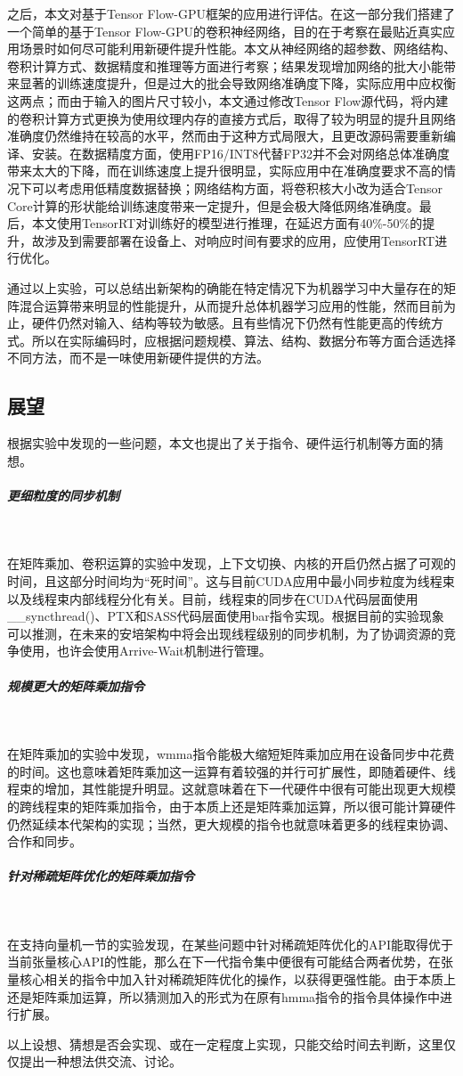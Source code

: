\par 之后，本文对基于Tensor Flow-GPU框架的应用进行评估。在这一部分我们搭建了一个简单的基于Tensor Flow-GPU的卷积神经网络，目的在于考察在最贴近真实应用场景时如何尽可能利用新硬件提升性能。本文从神经网络的超参数、网络结构、卷积计算方式、数据精度和推理等方面进行考察；结果发现增加网络的批大小能带来显著的训练速度提升，但是过大的批会导致网络准确度下降，实际应用中应权衡这两点；而由于输入的图片尺寸较小，本文通过修改Tensor Flow源代码，将内建的卷积计算方式更换为使用纹理内存的直接方式后，取得了较为明显的提升且网络准确度仍然维持在较高的水平，然而由于这种方式局限大，且更改源码需要重新编译、安装。在数据精度方面，使用FP16/INT8代替FP32并不会对网络总体准确度带来太大的下降，而在训练速度上提升很明显，实际应用中在准确度要求不高的情况下可以考虑用低精度数据替换；网络结构方面，将卷积核大小改为适合Tensor Core计算的形状能给训练速度带来一定提升，但是会极大降低网络准确度。最后，本文使用TensorRT对训练好的模型进行推理，在延迟方面有40\%-50\%的提升，故涉及到需要部署在设备上、对响应时间有要求的应用，应使用TensorRT进行优化。
\par 通过以上实验，可以总结出新架构的确能在特定情况下为机器学习中大量存在的矩阵混合运算带来明显的性能提升，从而提升总体机器学习应用的性能，然而目前为止，硬件仍然对输入、结构等较为敏感。且有些情况下仍然有性能更高的传统方式。所以在实际编码时，应根据问题规模、算法、结构、数据分布等方面合适选择不同方法，而不是一味使用新硬件提供的方法。
\subsection{展望}
\par 根据实验中发现的一些问题，本文也提出了关于指令、硬件运行机制等方面的猜想。
\subparagraph{更细粒度的同步机制}~{}
\par 在矩阵乘加、卷积运算的实验中发现，上下文切换、内核的开启仍然占据了可观的时间，且这部分时间均为“死时间”。这与目前CUDA应用中最小同步粒度为线程束以及线程束内部线程分化有关。目前，线程束的同步在CUDA代码层面使用\_\_syncthread()、PTX和SASS代码层面使用bar指令实现。根据目前的实验现象可以推测，在未来的安培架构中将会出现线程级别的同步机制，为了协调资源的竞争使用，也许会使用Arrive-Wait机制进行管理。
\subparagraph{规模更大的矩阵乘加指令}~{}
\par 在矩阵乘加的实验中发现，wmma指令能极大缩短矩阵乘加应用在设备同步中花费的时间。这也意味着矩阵乘加这一运算有着较强的并行可扩展性，即随着硬件、线程束的增加，其性能提升明显\cite{SCALABLITY}。这就意味着在下一代硬件中很有可能出现更大规模的跨线程束的矩阵乘加指令，由于本质上还是矩阵乘加运算，所以很可能计算硬件仍然延续本代架构的实现；当然，更大规模的指令也就意味着更多的线程束协调、合作和同步。
\subparagraph{针对稀疏矩阵优化的矩阵乘加指令}~{}
\par 在支持向量机一节的实验发现，在某些问题中针对稀疏矩阵优化的API能取得优于当前张量核心API的性能，那么在下一代指令集中便很有可能结合两者优势，在张量核心相关的指令中加入针对稀疏矩阵优化的操作，以获得更强性能。由于本质上还是矩阵乘加运算，所以猜测加入的形式为在原有hmma指令的指令具体操作中进行扩展。
\par 以上设想、猜想是否会实现、或在一定程度上实现，只能交给时间去判断，这里仅仅提出一种想法供交流、讨论。
